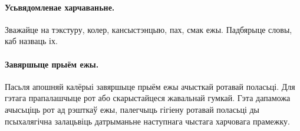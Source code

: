 
\paragraph{Усьвядомленае харчаваньне.}
Зважайце на тэкстуру, колер, кансыстэнцыю, пах, смак ежы. Падбярыце словы, каб назваць іх.

\paragraph{Завяршыце прыём ежы.}
Пасьля апошняй калёрыі завяршыце прыём ежы ачысткай ротавай поласьці. Для гэтага прапалашчыце рот або скарыстайцеся жавальнай гумкай. Гэта дапаможа ачысьціць рот ад рэшткаў ежы, палегчыць гігіену ротавай поласьці ды псыхалягічна залацьвіць датрыманьне наступнага чыстага харчовага прамежку.